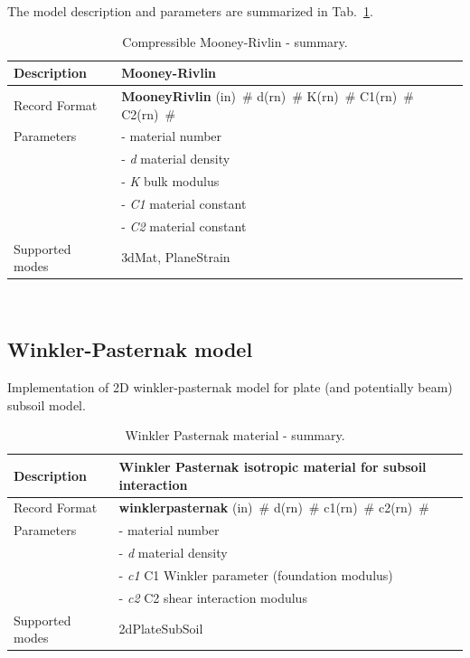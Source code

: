 \documentclass[a4paper]{article}
\newcommand{\descitem}[1]{{\noindent \bf #1}}
\newcommand{\elemparam}[2]{{{#1\tiny (#2)}~\#}}
\newcommand{\param}[1]{{\it #1}}
\newenvironment{mmt}{\begin{tabular}{|l|p{9cm}|}}{\end{tabular}\\}
\newenvironment{mmt}{\begin{tabular}{|l|l|}}{\end{tabular}\\}
\begin{document}
The model description and parameters are summarized in Tab.~\ref{MooneyRivlin_table}.
\begin{table}[!htb]
	\begin{mmt}
		\hline
		Description & Mooney-Rivlin\\
		\hline
		Record Format & \descitem{MooneyRivlin}  \elemparam{}{in}
		\elemparam{d}{rn} \elemparam{K}{rn} \elemparam{C1}{rn} \elemparam{C2}{rn}\\
		Parameters &- \param{} material number\\
		&- \param{d} material density\\
		&- \param{K} bulk modulus\\
		&- \param{C1} material constant\\
		&- \param{C2} material constant\\
		Supported modes& 3dMat, PlaneStrain\\
		\hline
	\end{mmt}
	\caption{Compressible Mooney-Rivlin - summary.}
	\label{MooneyRivlin_table}
\end{table}



\subsection{Winkler-Pasternak model}
Implementation of 2D winkler-pasternak model for plate (and potentially beam) subsoil model.
\begin{table}[!htb]
\begin{mmt}
\hline
Description & Winkler Pasternak isotropic material for subsoil interaction\\
\hline
Record Format & \descitem{winklerpasternak}  \elemparam{}{in}
\elemparam{d}{rn} \elemparam{c1}{rn} \elemparam{c2}{rn} \\
Parameters &- \param{} material number\\
&- \param{d} material density\\
&- \param{c1} C1 Winkler parameter (foundation modulus) \\
&- \param{c2} C2 shear interaction modulus \\
Supported modes& 2dPlateSubSoil\\
\hline
\end{mmt}
\caption{Winkler Pasternak material - summary.}
\label{WinklerPasternak_table}
\end{table}
\end{document}
